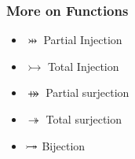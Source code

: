 \documentclass{beamer}
\begin{document}
\begin{frame}
\frametitle{More on Functions}
\begin{center}
\begin{minipage}{0.5\textwidth}
\begin{itemize}
\item $\pinj$ Partial Injection
\item $\tinj$ Total Injection
\item $\psur$ Partial surjection
\item $\tsur$ Total surjection
\item $\mathbin{ \rightarrowtail \mkern-18mu\twoheadrightarrow}$ Bijection
\end{itemize}
\end{minipage}
\end{center}
\end{frame}
\end{document}
